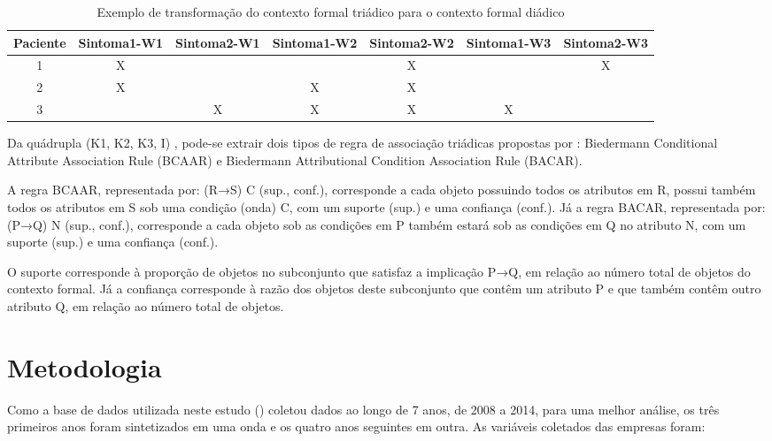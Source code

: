 \documentclass[12pt]{article}
\begin{document}
\begin{table}[h!] 
\scriptsize
\begin{center}
\caption{Exemplo de transformação do contexto formal triádico para o contexto formal diádico} \label{Tabela:1b}
\begin{tabular}{c|cc|cc|cc} 
\hline
Paciente &Sintoma1-W1&Sintoma2-W1&Sintoma1-W2&Sintoma2-W2&Sintoma1-W3&Sintoma2-W3\\
\hline
1   & X &  
    &   & X
    &   & X \\
2   & X &  
    & X & X
    &   &   \\
3   &   & X 
    & X & X
    & X &   \\
    \hline
\end{tabular}
\end{center}
\end{table}

Da quádrupla (K1, K2, K3, I) , pode-se extrair dois tipos de regra de associação triádicas propostas por \cite{biedermann:97}: Biedermann Conditional Attribute Association Rule (BCAAR) e Biedermann Attributional Condition Association Rule (BACAR).

A regra BCAAR, representada por: (R→S) C (sup., conf.), corresponde a cada objeto possuindo todos os atributos em R, possui também todos os atributos em S sob uma condição (onda) C, com um suporte (sup.) e uma confiança (conf.). Já a regra BACAR, representada por: (P→Q) N (sup., conf.), corresponde a cada objeto sob as condições em P também estará sob as condições em Q no atributo N, com um suporte (sup.) e uma confiança (conf.).

O suporte corresponde à proporção de objetos no subconjunto que satisfaz a implicação P→Q, em relação ao número total de objetos do contexto formal. Já a confiança corresponde à razão dos objetos deste subconjunto que contêm um atributo P e que também contêm outro atributo Q, em relação ao número total de objetos.

\section{Metodologia}

Como a base de dados utilizada neste estudo (\cite{KIM2019103967}) coletou dados ao longo de 7 anos, de 2008 a 2014, para uma melhor análise, os três primeiros anos foram sintetizados em uma onda e os quatro anos seguintes em outra. As variáveis coletados das empresas foram:
\end{document}

